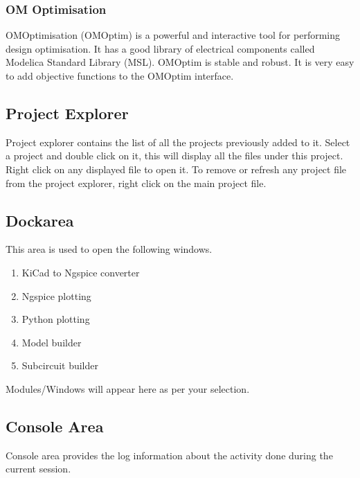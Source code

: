\subsubsection {OM Optimisation}
OMOptimisation (OMOptim) is a powerful and interactive tool for performing design optimisation. It has a good library of electrical components called Modelica Standard Library (MSL). OMOptim is stable and robust. It is very easy to add objective functions to the OMOptim interface.

\subsection{Project Explorer}
Project explorer contains the list of all the projects previously added to it. 
Select a project and double click on it, this will display all the files under 
this project. Right click on any displayed file to open it. To remove or refresh 
any project file from the project explorer, right click on the main project file.


\subsection{Dockarea}
This area is used to open the following windows.
\begin{enumerate}
    \item KiCad to Ngspice converter
    \item Ngspice plotting
    \item Python plotting
    \item Model builder
    \item Subcircuit builder
\end{enumerate}
Modules/Windows will appear here as per your selection.

\subsection{Console Area}
Console area provides the log information about the activity done during the current session.


